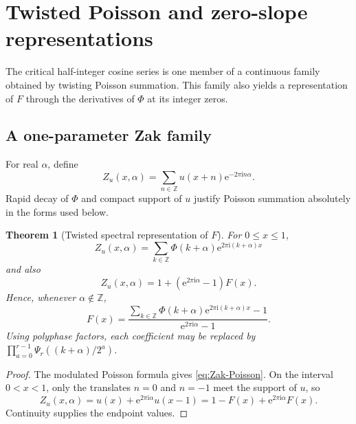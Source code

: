\documentclass[11pt,oneside]{article}
\numberwithin{equation}{section}
\newtheorem{theorem}{Theorem}[section]
\theoremstyle{definition}
\theoremstyle{remark}
\newcommand{\Z}{\mathbb Z}
\newcommand{\e}{\mathrm e}
\newcommand{\ii}{\mathrm i}
\begin{document}
\section{Twisted Poisson and zero-slope representations}
\label{sec:Zak}

The critical half-integer cosine series is one member of a continuous family
obtained by twisting Poisson summation.  This family also yields a representation
of $F$ through the derivatives of $\Phi$ at its integer zeros.

\subsection{A one-parameter Zak family}

For real $\alpha$, define
\begin{equation}
 Z_u(x,\alpha)=\sum_{n\in\Z}u(x+n)\e^{-2\pi\ii n\alpha}.   \label{eq:Zak-def}
\end{equation}
Rapid decay of $\Phi$ and compact support of $u$ justify Poisson summation
absolutely in the forms used below.

\begin{theorem}[Twisted spectral representation of $F$]
\label{thm:twisted-F}
For $0\le x\le1$,
\begin{equation}
 Z_u(x,\alpha)
 =\sum_{k\in\Z}\Phi(k+\alpha)
   \e^{2\pi\ii(k+\alpha)x}                                \label{eq:Zak-Poisson}
\end{equation}
and also
\begin{equation}
 Z_u(x,\alpha)=1+(\e^{2\pi\ii\alpha}-1)F(x).             \label{eq:Zak-fold}
\end{equation}
Hence, whenever $\alpha\notin\Z$,
\begin{equation}
 \boxed{\displaystyle
 F(x)=\frac{
   \sum_{k\in\Z}\Phi(k+\alpha)
       \e^{2\pi\ii(k+\alpha)x}-1}
  {\e^{2\pi\ii\alpha}-1}.}                              \label{eq:F-twisted-Poisson}
\end{equation}
Using polyphase factors, each coefficient may be replaced by
$\prod_{a=0}^{r-1}\Psi_r((k+\alpha)/2^a)$.
\end{theorem}

\begin{proof}
The modulated Poisson formula gives \eqref{eq:Zak-Poisson}.  On the interval
$0<x<1$, only the translates $n=0$ and $n=-1$ meet the support of $u$, so
\[
 Z_u(x,\alpha)=u(x)+\e^{2\pi\ii\alpha}u(x-1)
 =1-F(x)+\e^{2\pi\ii\alpha}F(x).
\]
Continuity supplies the endpoint values.
\end{proof}
\end{document}
